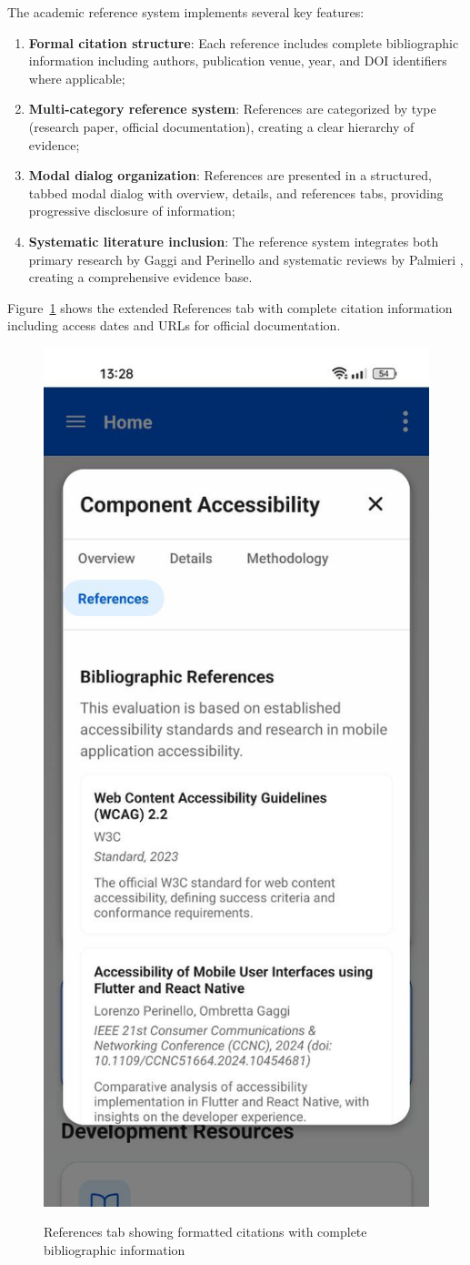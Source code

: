 \FloatBarrier

The academic reference system implements several key features:

\begin{enumerate}
    \item \textbf{Formal citation structure}: Each reference includes complete bibliographic information including authors, publication venue, year, and DOI identifiers where applicable;
    
    \item \textbf{Multi-category reference system}: References are categorized by type (research paper, official documentation), creating a clear hierarchy of evidence;
    
    \item \textbf{Modal dialog organization}: References are presented in a structured, tabbed modal dialog with overview, details, and references tabs, providing progressive disclosure of information;
    
    \item \textbf{Systematic literature inclusion}: The reference system integrates both primary research by Gaggi and Perinello \cite{perinello2024accessibility} and systematic reviews by Palmieri \cite{palmieri2022accessibility}, creating a comprehensive evidence base.
\end{enumerate}

Figure~\ref{fig:academic_references_detail} shows the extended References tab with complete citation information including access dates and URLs for official documentation.

\begin{figure}[ht]
    \centering
    \includegraphics[width=0.4\linewidth, alt={Reference tab showing detailed citation information}]{img/references.jpg}
    \caption{References tab showing formatted citations with complete bibliographic information}
    \label{fig:academic_references_detail}
\end{figure}

